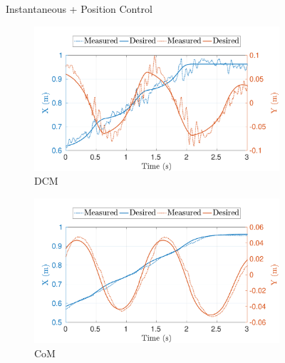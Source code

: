 \begin{figure}[t]
     \vspace*{-0.1cm}
    \begin{myframe}{Instantaneous + Position Control}
    \centering
        \begin{subfigure}[b]{0.49\textwidth}
        \centering
        \includegraphics[width=\textwidth]{chapter_simplified_benchmarking/figures/inst_pos-max_vel-dcm.pdf}
        \caption{DCM}
        \label{fig:inst_pos-max_vel-dcm}
    \end{subfigure}
    \hfill
     \begin{subfigure}[b]{0.49\textwidth}
        \centering
        \includegraphics[width=\textwidth]{chapter_simplified_benchmarking/figures/inst_pos-max_vel-com.pdf}
        \caption{CoM}
        \label{fig:inst_pos-max_vel-com}
    \end{subfigure}
    \hfill
    \begin{subfigure}[b]{0.49\textwidth}
        \centering

\end{subfigure}
\end{myframe}
\end{figure}
